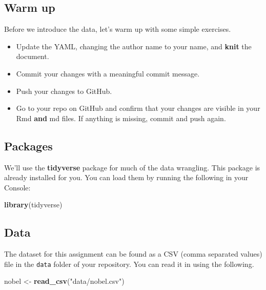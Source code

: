 \documentclass[
]{article}
\newenvironment{Shaded}{\begin{snugshade}}{\end{snugshade}}
\newcommand{\FunctionTok}[1]{\textcolor[rgb]{0.13,0.29,0.53}{\textbf{#1}}}
\newcommand{\NormalTok}[1]{#1}
\newcommand{\OtherTok}[1]{\textcolor[rgb]{0.56,0.35,0.01}{#1}}
\newcommand{\StringTok}[1]{\textcolor[rgb]{0.31,0.60,0.02}{#1}}
\providecommand{\tightlist}{%
  \setlength{\itemsep}{0pt}\setlength{\parskip}{0pt}}
\begin{document}
\subsection{Warm up}\label{warm-up}

Before we introduce the data, let's warm up with some simple exercises.

\begin{itemize}
\tightlist
\item
  Update the YAML, changing the author name to your name, and
  \textbf{knit} the document.
\item
  Commit your changes with a meaningful commit message.
\item
  Push your changes to GitHub.
\item
  Go to your repo on GitHub and confirm that your changes are visible in
  your Rmd \textbf{and} md files. If anything is missing, commit and
  push again.
\end{itemize}

\subsection{Packages}\label{packages}

We'll use the \textbf{tidyverse} package for much of the data wrangling.
This package is already installed for you. You can load them by running
the following in your Console:

\begin{Shaded}
\begin{Highlighting}[]
\FunctionTok{library}\NormalTok{(tidyverse)}
\end{Highlighting}
\end{Shaded}

\subsection{Data}\label{data}

The dataset for this assignment can be found as a CSV (comma separated
values) file in the \texttt{data} folder of your repository. You can
read it in using the following.

\begin{Shaded}
\begin{Highlighting}[]
\NormalTok{nobel }\OtherTok{\textless{}{-}} \FunctionTok{read\_csv}\NormalTok{(}\StringTok{"data/nobel.csv"}\NormalTok{)}
\end{Highlighting}
\end{Shaded}
\end{document}
